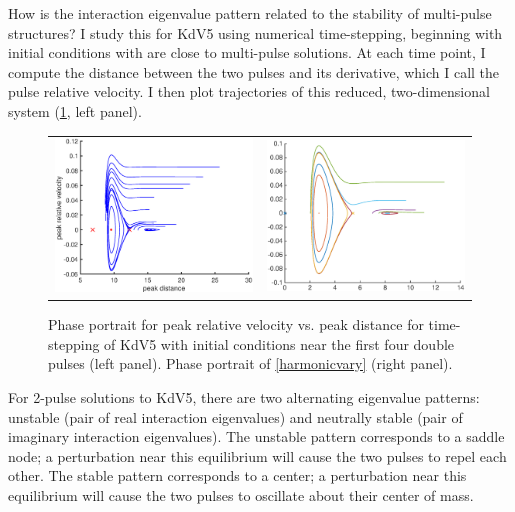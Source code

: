 \documentclass[12pt,reqno,oneside]{article}
\theoremstyle{definition}
\theoremstyle{remark}
\begin{document}
How is the interaction eigenvalue pattern related to the stability of multi-pulse structures? I study this for KdV5 using numerical time-stepping, beginning with initial conditions with are close to multi-pulse solutions. At each time point, I compute the distance between the two pulses and its derivative, which I call the pulse relative velocity. I then plot trajectories of this reduced, two-dimensional system (\cref{fig:KdV5timestep}, left panel). 
\begin{figure}[H]
\begin{center}
\begin{tabular}{cc}
\includegraphics[width=7cm]{images/phaseportrait}  &
\includegraphics[width=7cm]{images/simplephaseportrait}
\end{tabular}
\end{center}
\caption{Phase portrait for peak relative velocity vs. peak distance for time-stepping of KdV5 with initial conditions near the first four double pulses (left panel). Phase portrait of \cref{harmonicvary} (right panel).
}
\label{fig:KdV5timestep}
\end{figure}
For 2-pulse solutions to KdV5, there are two alternating eigenvalue patterns: unstable (pair of real interaction eigenvalues) and neutrally stable (pair of imaginary interaction eigenvalues). The unstable pattern corresponds to a saddle node; a perturbation near this equilibrium will cause the two pulses to repel each other. The stable pattern corresponds to a center; a perturbation near this equilibrium will cause the two pulses to oscillate about their center of mass. 
\end{document}
